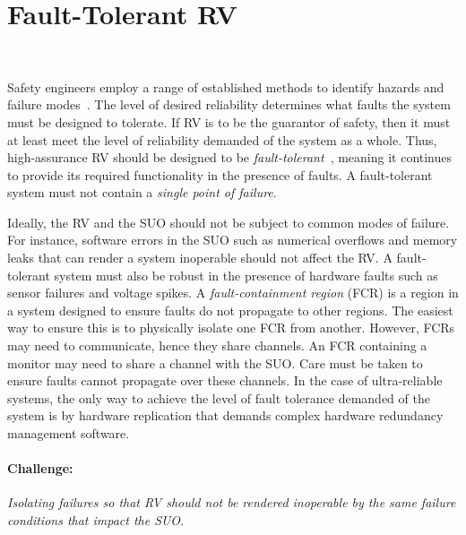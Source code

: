 \section{Fault-Tolerant RV}~\label{sec:ft}

 
Safety engineers employ a range of established methods to identify
hazards and failure modes~\cite{SAE4761}.  The level of desired
reliability determines what faults the system must be designed to
tolerate. If RV is to be the guarantor of safety, then it must at
least meet the level of reliability demanded of the system as a whole.
Thus, high-assurance RV should  be designed to be
\emph{fault-tolerant}~\cite{butler-faults}, meaning it continues
to provide its required functionality in the presence of faults.  A
fault-tolerant system must not contain a \emph{single point of
  failure}.

 Ideally, the RV and the SUO should not be subject to common
 modes of failure.  For instance, software errors in the SUO such as
 numerical overflows and memory leaks that can render a system
 inoperable should not affect the RV.  A fault-tolerant system must
 also be robust in the presence of hardware faults such as sensor failures
 and voltage spikes.  A \emph{fault-containment region} (FCR)
 is a region in a system designed to ensure faults do not propagate to
 other regions.  The 
 easiest way to ensure this is to physically isolate one FCR from
 another.  However, FCRs may need to communicate, hence they share
 channels. An FCR containing a monitor may need to share a channel
 with the SUO.  Care must be taken to ensure faults cannot propagate
 over these channels. In the case of ultra-reliable systems, the only
 way to achieve the level of fault tolerance demanded of the system is
 by hardware replication that demands complex hardware redundancy
 management software. 


\paragraph{Challenge:}   \emph{Isolating failures so that  RV  should not be rendered inoperable by the
 same failure conditions that impact the SUO.}


